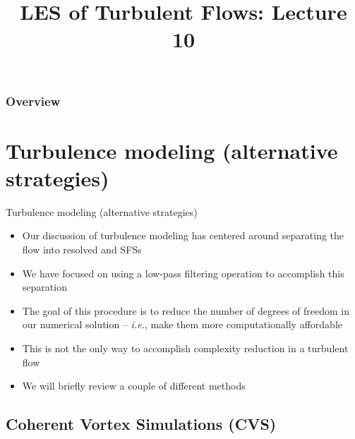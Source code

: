 
\title{LES of Turbulent Flows: Lecture 10}




\begin{frame} 
  \titlepage
\end{frame}


\begin{frame}
\frametitle{Overview}
\tableofcontents
\end{frame}

\section{Turbulence modeling (alternative strategies) } %

\begin{frame}{Turbulence modeling (alternative strategies)}

\begin{itemize}
	\item Our discussion of turbulence modeling has centered around separating the flow into resolved and SFSs
	\item We have focused on using a low-pass filtering operation to accomplish this separation
	\item The goal of this procedure is to reduce the number of degrees of freedom in our numerical solution -- \textit{i.e.}, make them more computationally affordable
	\item This is not the only way to accomplish complexity reduction in a turbulent flow
	\item We will briefly review a couple of different methods
\end{itemize}

\end{frame}

\subsection{Coherent Vortex Simulations (CVS)}

